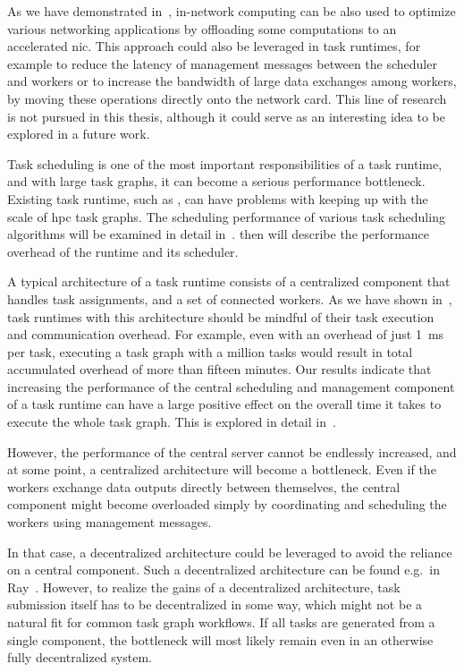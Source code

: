 \begin{description}[wide=0pt]
		As we have demonstrated in~\cite{pspin, spin2}, in-network computing can be also used to
		optimize various networking applications by offloading some computations to an accelerated
		\gls{nic}. This approach could also be leveraged in task runtimes, for example to
		reduce the latency of management messages between the scheduler and workers or to increase the
		bandwidth of large data exchanges among workers, by moving these operations directly onto the
		network card. This line of research is not pursued in this thesis, although it could serve as an
		interesting idea to be explored in a future work.
	\item[Scheduling] Task scheduling is one of the most important responsibilities of a task runtime, and with large
		task graphs, it can become a serious performance bottleneck. Existing task runtime, such as
		\dask{}, can have problems with keeping up with the scale of
		\gls{hpc} task graphs. The scheduling performance of various task scheduling
		algorithms will be examined in detail in~. 
		then will describe the performance overhead of the \dask{} runtime and its
		scheduler.
	\item[Runtime overhead] A typical architecture of a task runtime consists of a centralized component that handles task
		assignments, and a set of connected workers. As we have shown in~\cite{rsds}, task
		runtimes with this architecture should be mindful of their task execution and communication
		overhead. For example, even with an overhead of just \SI{1}{\milli\second} per task, executing
		a task graph with a million tasks would result in total accumulated overhead of more than fifteen
		minutes. Our results indicate that increasing the performance of the central scheduling and
		management component of a task runtime can have a large positive effect on the overall time it
		takes to execute the whole task graph. This is explored in detail in~.

		However, the performance of the central server cannot be endlessly increased, and at some point, a
		centralized architecture will become a bottleneck. Even if the workers exchange data outputs
		directly between themselves, the central component might become overloaded simply by coordinating
		and scheduling the workers using management messages.

		In that case, a decentralized architecture could be leveraged to avoid the reliance on a central
		component. Such a decentralized architecture can be found e.g.\ in Ray~\cite{ray}.
		However, to realize the gains of a decentralized architecture, task submission itself has to be
		decentralized in some way, which might not be a natural fit for common task graph workflows. If all
		tasks are generated from a single component, the bottleneck will most likely remain even in an
		otherwise fully decentralized system.
\end{description}


